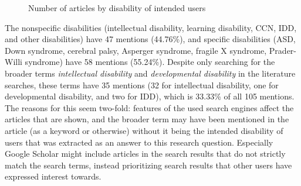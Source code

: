 \documentclass[utf8,english]{gradu3}
\begin{document}
\begin{figure}[thb]
  \centering
  \caption{Number of articles by disability of intended users}
  \label{kuvaVammat}
\end{figure}

The nonspecific disabilities (intellectual disability, learning disability, CCN, IDD, and other disabilities)
have 47 mentions (44.76\%), and specific disabilities (ASD, Down syndrome, cerebral palsy,
Asperger syndrome, fragile X syndrome, Prader-Willi syndrome) have 58 mentions (55.24\%).
Despite only searching for the broader terms \textit{intellectual disability} and \textit{developmental disability}
in the literature searches, these terms have 35 mentions (32 for intellectual disability, one for developmental disability,
and two for IDD), which is 33.33\% of all 105 mentions.
The reasons for this seem two-fold: features of the used search engines affect the articles that are shown,
and the broader term may have been mentioned in the article (as a keyword or otherwise) without
it being the intended disability of users that was extracted as an answer to this research question.
Especially Google Scholar might include articles in the search results that do not strictly match the search terms,
instead prioritizing search results that other users have expressed interest towards.
\end{document}
